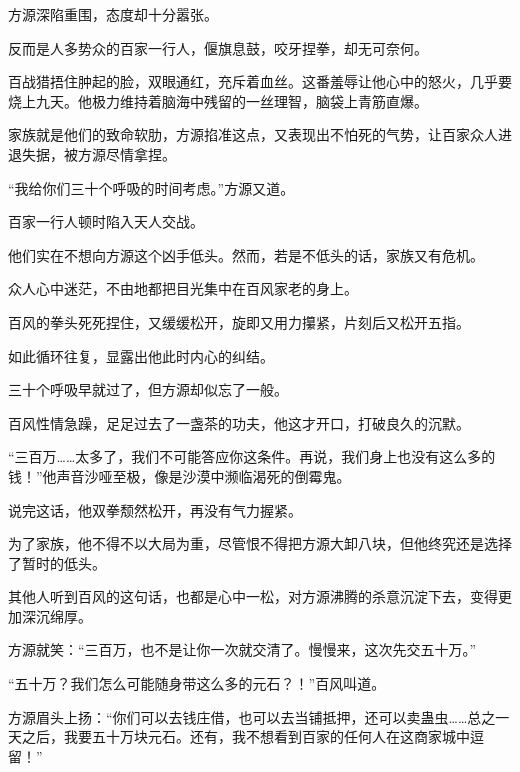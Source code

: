 \begin{this_body}
方源深陷重围，态度却十分嚣张。

反而是人多势众的百家一行人，偃旗息鼓，咬牙捏拳，却无可奈何。

百战猎捂住肿起的脸，双眼通红，充斥着血丝。这番羞辱让他心中的怒火，几乎要烧上九天。他极力维持着脑海中残留的一丝理智，脑袋上青筋直爆。

家族就是他们的致命软肋，方源掐准这点，又表现出不怕死的气势，让百家众人进退失据，被方源尽情拿捏。

“我给你们三十个呼吸的时间考虑。”方源又道。

百家一行人顿时陷入天人交战。

他们实在不想向方源这个凶手低头。然而，若是不低头的话，家族又有危机。

众人心中迷茫，不由地都把目光集中在百风家老的身上。

百风的拳头死死捏住，又缓缓松开，旋即又用力攥紧，片刻后又松开五指。

如此循环往复，显露出他此时内心的纠结。

三十个呼吸早就过了，但方源却似忘了一般。

百风性情急躁，足足过去了一盏茶的功夫，他这才开口，打破良久的沉默。

“三百万……太多了，我们不可能答应你这条件。再说，我们身上也没有这么多的钱！”他声音沙哑至极，像是沙漠中濒临渴死的倒霉鬼。

说完这话，他双拳颓然松开，再没有气力握紧。

为了家族，他不得不以大局为重，尽管恨不得把方源大卸八块，但他终究还是选择了暂时的低头。

其他人听到百风的这句话，也都是心中一松，对方源沸腾的杀意沉淀下去，变得更加深沉绵厚。

方源就笑：“三百万，也不是让你一次就交清了。慢慢来，这次先交五十万。”

“五十万？我们怎么可能随身带这么多的元石？！”百风叫道。

方源眉头上扬：“你们可以去钱庄借，也可以去当铺抵押，还可以卖蛊虫……总之一天之后，我要五十万块元石。还有，我不想看到百家的任何人在这商家城中逗留！”

\end{this_body}

